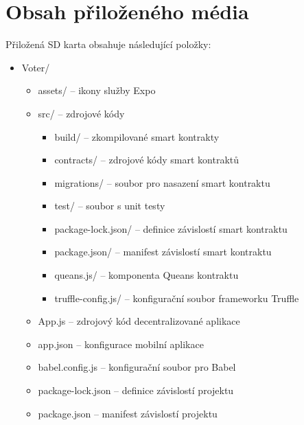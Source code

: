 
%


\chapter{Obsah přiloženého média}
Přiložená SD karta obsahuje následující položky:
\begin{itemize}
    \item Voter/
    \begin{itemize}
        \item assets/ -- ikony služby Expo 
        \item src/ -- zdrojové kódy 
        \begin{itemize}
            \item build/ -- zkompilované smart kontrakty 
            \item contracts/ -- zdrojové kódy smart kontraktů
            \item migrations/ -- soubor pro nasazení smart kontraktu
            \item test/ -- soubor s unit testy
            \item package-lock.json/ -- definice závislostí smart kontraktu
            \item package.json/ -- manifest závislostí smart kontraktu
            \item queans.js/ -- komponenta Queans kontraktu
            \item truffle-config.js/ -- konfigurační soubor frameworku Truffle
        \end{itemize}
        \item App.js -- zdrojový kód decentralizované aplikace
        \item app.json -- konfigurace mobilní aplikace
        \item babel.config.js -- konfigurační soubor pro Babel
        \item package-lock.json -- definice závislostí projektu
        \item package.json -- manifest závislostí projektu

\end{itemize}
\end{itemize}
